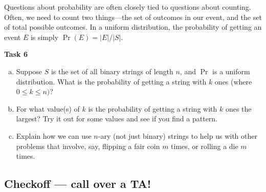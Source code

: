 \documentclass[12pt,letterpaper]{article}
\newenvironment{22enumerate}{\begin{enumerate}[a.]\itemsep0em}{\end{enumerate}}
\begin{document}
Questions about probability are often closely tied to questions about counting. Often, we need to count two things---the set of outcomes in our event, and the set of total possible outcomes. In a uniform distribution, the probability of getting an event $E$ is simply $\Pr(E) = |E|/|S|$.

\textbf{Task 6}
\begin{22enumerate}
  
\item Suppose $S$ is the set of all binary strings of length $n$, and $\Pr$ is a uniform distribution. What is the probability of getting a string with $k$ ones (where $0 \leq k \leq n)$? 

\begin{mdframed} \vspace{1cm} \end{mdframed}

\item For what value(s) of $k$ is the probability of getting a string with $k$ ones the largest? Try it out for some values and see if you find a pattern.

\begin{mdframed} \vspace{1cm} \end{mdframed}

\item Explain how we can use $n$-ary (not just binary) strings to help us with other problems that involve, say, flipping a fair coin $m$ times, or rolling a die $m$ times. 

\begin{mdframed} \vspace{2cm} \end{mdframed}

\end{22enumerate}

\subsection*{Checkoff — call over a TA!}
\end{document}
